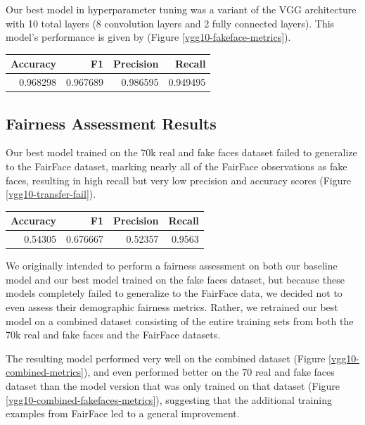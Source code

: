\documentclass[11pt, letterpaper]{article}
\newenvironment{Figure}
  {\par\medskip\noindent\minipage{\linewidth}}
  {\endminipage\par\medskip}
\begin{document}
\begin{multicols}{2}
  Our best model in hyperparameter tuning was a variant of the VGG architecture
  \cite{simonyan2015deep} with 10 total layers (8 convolution layers and 2 fully
  connected layers). This model's performance is given by
  (Figure \ref{vgg10-fakeface-metrics}).

  \begin{Figure}
    \centering
    \label{vgg10-fakeface-metrics}
    \begin{tabular}{rrrr}
    \toprule
     Accuracy &        F1 &  Precision &    Recall \\
    \midrule
     0.968298 &  0.967689 &   0.986595 &  0.949495 \\
    \bottomrule
    \end{tabular}
  \end{Figure}


  \subsection{Fairness Assessment Results}

  Our best model trained on the 70k real and fake faces dataset failed to
  generalize to the FairFace dataset, marking nearly all of the FairFace
  observations as fake faces, resulting in high recall but very low precision
  and accuracy scores (Figure \ref{vgg10-transfer-fail}).

  \begin{Figure}
    \centering
    \label{vgg10-transfer-fail}
    \begin{tabular}{rrrr}
    \toprule
    Accuracy &        F1 &  Precision &  Recall \\
    \midrule
      0.54305 &  0.676667 &    0.52357 &  0.9563 \\
    \bottomrule
    \end{tabular}
  \end{Figure}

  We originally intended to perform a fairness assessment on both our baseline
  model and our best model trained on the fake faces dataset, but because
  these models completely failed to generalize to the FairFace data,
  we decided not to even assess their demographic fairness metrics. Rather, we
  retrained our best model on a combined dataset consisting of the entire
  training sets from both the 70k real and fake faces and the FairFace datasets.

  The resulting model performed very well on the combined dataset (Figure
  \ref{vgg10-combined-metrics}), and even performed better on the 70 real and
  fake faces dataset than the model version that was only trained on that
  dataset (Figure \ref{vgg10-combined-fakefaces-metrics}), suggesting that the
  additional training examples from FairFace led to a general improvement.


\end{multicols}
\end{document}
